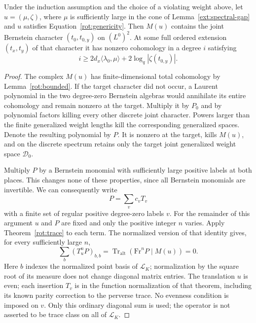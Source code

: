 \begin{proposition}\label{ext:lower}
 Under the induction assumption and the choice of a violating weight
 above, let $u=(\mu,\zeta)$, where $\mu$ is sufficiently large in the
 cone of Lemma~\ref{ext:spectral-gap} and $u$ satisfies
 Equation~\eqref{rot:genericity}.  Then $M(u)$ contains the joint
 Bernstein character $(t_0,t_{0,y})$ on $(L^0)^2$.  At some full ordered
 extension $(t_x,t_y)$ of that character it has nonzero cohomology in a
 degree $i$ satisfying
 \begin{equation}\label{ext:degree-lower}
    i\ge 2d_x\langle\lambda_0,\mu\rangle
                       +2\log_q|\zeta(t_{0,y})|.
 \end{equation}
\end{proposition}

\begin{proof}
 The complex $M(u)$ has finite-dimensional total cohomology by
 Lemma~\ref{rot:bounded}.  If the target character did not occur,
 a Laurent polynomial in the two degree-zero Bernstein algebras would
 annihilate its entire cohomology and remain nonzero at the target.
 Multiply it by $P_0$ and by polynomial factors killing every other
 discrete joint character.  Powers larger than the finite generalized
 weight lengths kill the corresponding generalized spaces.  Denote
 the resulting polynomial by $P$.  It is nonzero at the target, kills
 $M(u)$, and on the discrete spectrum retains only the target joint
 generalized weight space $\mathcal D_0$.

 Multiply $P$ by a Bernstein monomial with sufficiently large positive
 labels at both places.  This changes none of these properties, since
 all Bernstein monomials are invertible.  We can consequently write
 \[
       P=\sum_{v}c_vT_v
 \]
 with a finite set of regular positive degree-zero labels $v$.  For
 the remainder of this argument $u$ and $P$ are fixed and only the
 positive integer $n$ varies.  Apply Theorem~\ref{rot:trace} to each
 term.  The normalized version of that identity gives, for every
 sufficiently large $n$,
 \begin{equation}\label{ext:filtered-diagonal}
   \sum_b(T_u^nP)_{b,b}
       =\operatorname{Tr}_{\mathrm{alt}}
                    (\mathrm{Fr}^nP\mid M(u))=0.
 \end{equation}
 Here $b$ indexes the normalized point basis of $\mathcal L_K$;
 normalization by the square root of its measure does not change
 diagonal matrix entries.  The translation $u$ is even; each insertion $T_v$ is in the
 function normalization of that theorem, including its known parity
 correction to the perverse trace.  No evenness condition is imposed
 on $v$.  Only
 this ordinary diagonal sum is used; the operator is not asserted
 to be trace class on all of $\mathcal L_K$.


\end{proof}
